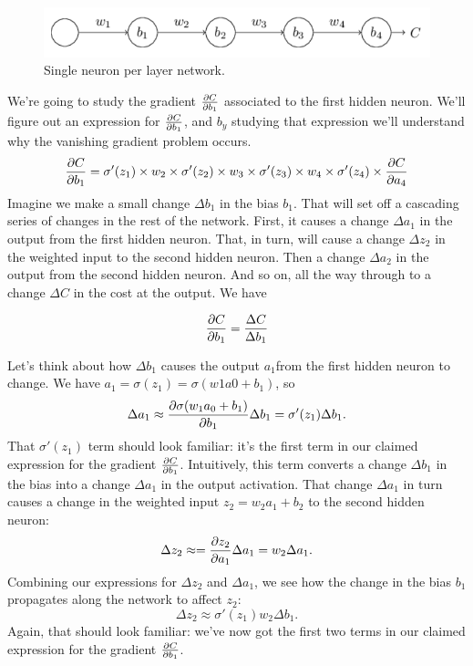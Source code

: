 \begin{figure}
\centering
\includegraphics[scale=0.5]{img/singleNeuronNetwork}
\caption{Single neuron per layer network.}
\label{singleNeuronNetwork}
\end{figure}
We're going to study the gradient $\frac{\mathrm{\partial} C}{\mathrm{\partial} b_1}$ associated to the first hidden neuron. We'll figure out an expression for $\frac{\mathrm{\partial} C}{\mathrm{\partial} b_1}$, and $b_y$ studying that expression we'll understand why the vanishing gradient problem occurs.
\begin{equation}
\frac{\mathrm{\partial} C}{\mathrm{\partial} b_1} = \sigma'(z_1) \times w_2 \times \sigma'(z_2)\times w_3 \times \sigma'(z_3) \times w_4 \times \sigma'(z_4) \times \frac{\mathrm{\partial} C}{\mathrm{\partial} a_4}
\end{equation}
Imagine we make a small change $\Delta b_1$ in the bias $b_1$. That will set off a cascading series of changes in the rest of the network. First, it causes a change $\Delta a_1$ in the output from the first hidden neuron. That, in turn, will cause a change $\Delta z_2$ in the weighted input to the second hidden neuron. Then a change $\Delta a_2$ in the output from the second hidden neuron. And so on, all the way through to a change $\Delta C$ in the cost at the output. We have

\begin{equation}
\frac{\mathrm{\partial} C}{\mathrm{\partial} b_1} = \frac{\Delta C}{\Delta b_1}
\end{equation}

Let's think about how $\Delta b_1$ causes the output $a_1 $from the first hidden neuron to change. We have $a_1=\sigma(z_1)=\sigma(w1a0+b_1)$, so 
\begin{equation}
\Delta a_1\approx \frac{\mathrm{\partial} \sigma(w_1a_0+b_1)}{\mathrm{\partial} b_1}\Delta b_1 = \sigma'(z_1)\Delta b_1. 
\end{equation}
That $\sigma'(z_1)$ term should look familiar: it's the first term in our claimed expression for the gradient $\frac{\mathrm{\partial} C}{\mathrm{\partial} b_1}$. Intuitively, this term converts a change $\Delta b_1$ in the bias into a change $\Delta a_1$ in the output activation. That change $\Delta a_1$ in turn causes a change in the weighted input $z_2=w_2a_1+b_2$ to the second hidden neuron:
\begin{equation}
\Delta z_2\approx=\frac{\mathrm{\partial} z_2}{\mathrm{\partial} a_1} \Delta a_1 = w_2\Delta a_1.
\end{equation}
Combining our expressions for $\Delta z_2$ and $\Delta a_1$, we see how the change in the bias $b_1$ propagates along the network to affect $z_2$:
\begin{equation}
\Delta z_2\approx\sigma'(z_1)w_2\Delta b_1.
\end{equation}
Again, that should look familiar: we've now got the first two terms in our claimed expression for the gradient $\frac{\mathrm{\partial} C}{\mathrm{\partial} b_1}$.

